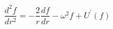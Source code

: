 \begin{equation}
\frac{d^{2}f}{dr^{2}}=-\frac{2}{r}\frac{df}{dr}-\omega
^{2}f+U^{\prime }(f) \label{gene}
\end{equation}

